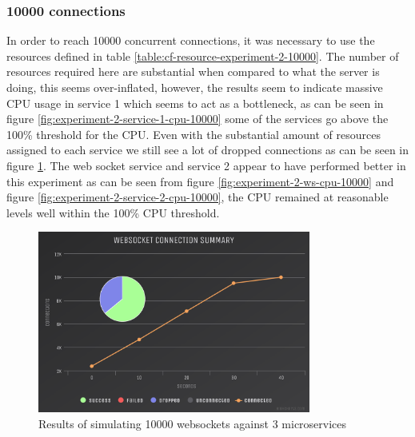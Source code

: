 \subsubsection{10000 connections}

In order to reach 10000 concurrent connections, it was necessary to use the resources defined in table \ref{table:cf-resource-experiment-2-10000}. The number of resources required here are substantial when compared to what the server is doing, this seems over-inflated, however, the results seem to indicate massive CPU usage in service 1 which seems to act as a bottleneck, as can be seen in figure \ref{fig:experiment-2-service-1-cpu-10000} some of the services go above the 100\% threshold for the CPU. Even with the substantial amount of resources assigned to each service we still see a lot of dropped connections as can be seen in figure \ref{fig:experiment-2-conn-10000}. The web socket service and service 2 appear to have performed better in this experiment as can be seen from figure \ref{fig:experiment-2-ws-cpu-10000} and figure \ref{fig:experiment-2-service-2-cpu-10000}, the CPU remained at reasonable levels well within the 100\% CPU threshold.

\begin{table}[H]
\caption{Resources allocated to each service}
\label{table:cf-resource-experiment-2-10000}
\end{table}

\begin{figure}[H]
  \centering
    \includegraphics[width=0.8\textwidth]{figures/experiments/experiment-2/10000/conn-10000.png}
    \caption{Results of simulating 10000 websockets against 3 microservices}
    \label{fig:experiment-2-conn-10000}
\end{figure}

